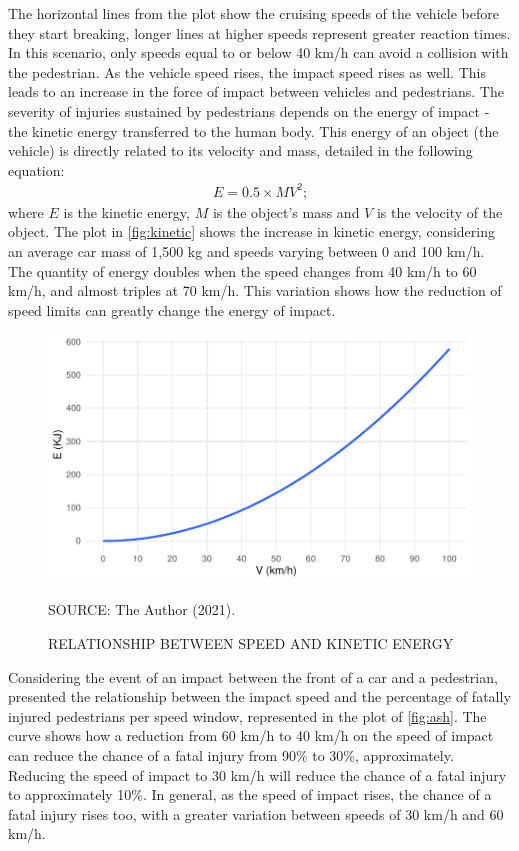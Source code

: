 The horizontal lines from the plot show the cruising speeds of the vehicle before they start breaking, longer lines at higher speeds represent greater reaction times. In this scenario, only speeds equal to or below 40 km/h can avoid a collision with the pedestrian. As the vehicle speed rises, the impact speed rises as well. This leads to  an increase in the force of impact between vehicles and pedestrians. The severity of injuries sustained by pedestrians depends on the energy of impact - the kinetic energy transferred to the human body. This energy of an object (the vehicle) is directly related to its velocity and mass, detailed in the following equation: \begin{align}
    E = 0.5 \times MV^2 \mbox{;}
    \label{eq:energy}
\end{align} where $E$ is the kinetic energy, $M$ is the object's mass and $V$ is the velocity of the object. The plot in \autoref{fig:kinetic} shows the increase in kinetic energy, considering an average car mass of 1,500 kg \cite{Zervas2008} and speeds varying between 0 and 100 km/h. The quantity of energy doubles when the speed changes from 40 km/h to 60 km/h, and almost triples at 70 km/h. This variation shows how the reduction of speed limits can greatly change the energy of impact.

\begin{figure}[!htbp]
    \centering\footnotesize
    \captionsetup{font=footnotesize}
    \caption{RELATIONSHIP BETWEEN SPEED AND KINETIC ENERGY}
    \includegraphics{fig/kinetic.pdf}
    \label{fig:kinetic}
    \par SOURCE: The Author (2021).
\end{figure}

Considering the event of an impact between the front of a car and a pedestrian, \textcite{Ashton1980} presented the relationship between the impact speed and the percentage of fatally injured pedestrians per speed window, represented in the plot of \autoref{fig:ash}. The curve shows how a reduction from 60 km/h to 40 km/h on the speed of impact can reduce the chance of a fatal injury from 90\% to 30\%, approximately. Reducing the speed of impact to 30 km/h will reduce the chance of a fatal injury to approximately 10\%. In general, as the speed of impact rises, the chance of a fatal injury rises too, with a greater variation between speeds of 30 km/h and 60 km/h. 

